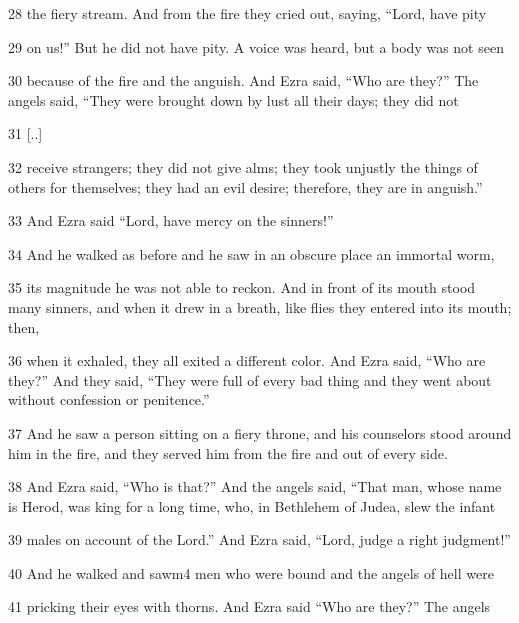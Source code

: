 \par 28 the fiery stream. And from the fire they cried out, saying, “Lord, have pity

\par 29 on us!” But he did not have pity. A voice was heard, but a body was not seen

\par 30 because of the fire and the anguish. And Ezra said, “Who are they?” The angels said, “They were brought down by lust all their days; they did not

\par 31 [..]

\par 32 receive strangers; they did not give alms; they took unjustly the things of others for themselves; they had an evil desire; therefore, they are in anguish.”

\par 33 And Ezra said “Lord, have mercy on the sinners!”

\par 34 And he walked as before and he saw in an obscure place an immortal worm,

\par 35 its magnitude he was not able to reckon. And in front of its mouth stood many sinners, and when it drew in a breath, like flies they entered into its mouth; then,

\par 36 when it exhaled, they all exited a different color. And Ezra said, “Who are they?” And they said, “They were full of every bad thing and they went about without confession or penitence.”

\par 37 And he saw a person sitting on a fiery throne, and his counselors stood around him in the fire, and they served him from the fire and out of every side.

\par 38 And Ezra said, “Who is that?” And the angels said, “That man, whose name is Herod, was king for a long time, who, in Bethlehem of Judea, slew the infant

\par 39 males on account of the Lord.” And Ezra said, “Lord, judge a right judgment!”

\par 40 And he walked and sawm4 men who were bound and the angels of hell were

\par 41 pricking their eyes with thorns. And Ezra said “Who are they?” The angels


